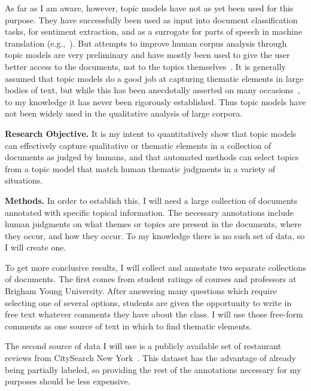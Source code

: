 \documentclass[onecolumn, 12pt]{article}
\begin{document}
As far as I am aware, however, topic models have not as yet been used for this
purpose.  They have successfully been used as input into document
classification tasks, for sentiment extraction, and as a surrogate for parts of
speech in machine translation (e.g.,~\cite{blei-2008-supervised-topic-models}).
But attempts to improve human corpus analysis through topic models are very
preliminary and have mostly been used to give the user better access to the
documents, not to the topics
themselves~\cite{newman-2010-visualizing-with-topic-maps}.  It is generally
assumed that topic models do a good job at capturing thematic elements in large
bodies of text, but while this has been anecdotally asserted on many
occasions~\cite{griffiths-2004-finding-scientific-topics}, to my knowledge it
has never been rigorously established.  Thus topic models have not been widely
used in the qualitative analysis of large corpora.

\textbf{Research Objective.}  It is my intent to quantitatively show that
topic models can effectively capture qualitative or thematic elements in a
collection of documents as judged by humans, and that automated methods can
select topics from a topic model that match human thematic judgments in a
variety of situations.

\textbf{Methods.}  In order to establish this, I will need a large collection
of documents annotated with specific topical information.  The necessary
annotations include human judgments on what themes or topics are present in
the documents, where they occur, and how they occur.  To my knowledge there is
no such set of data, so I will create one.  

To get more conclusive results, I will collect and annotate two separate
collections of documents.  The first comes from student ratings of courses and
professors at Brigham Young University.  After answering many questions which
require selecting one of several options, students are given the opportunity to
write in free text whatever comments they have about the class.  I will use
those free-form comments as one source of text in which to find thematic
elements.

The second source of data I will use is a publicly available set of restaurant
reviews from CitySearch New York~\cite{ganu-2009-restaurant-ratings}.  This
dataset has the advantage of already being partially labeled, so providing the
rest of the annotations necessary for my purposes should be less expensive.
\end{document}

